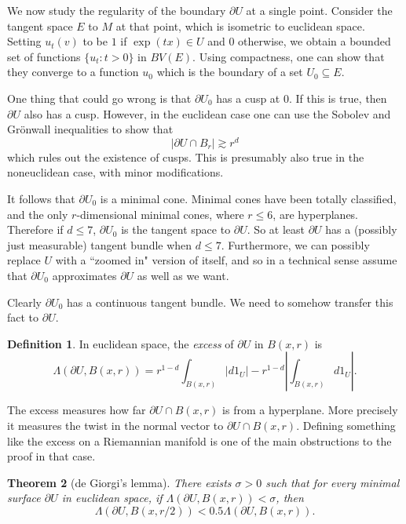 \documentclass[reqno,12pt,letterpaper]{amsart}
\newcommand{\dfn}[1]{\emph{#1}\index{#1}}
\newtheorem{theorem}{Theorem}[section]
\theoremstyle{definition}
\newtheorem{definition}[theorem]{Definition}
\begin{document}
We now study the regularity of the boundary $\partial U$ at a single point.
Consider the tangent space $E$ to $M$ at that point, which is isometric to euclidean space.
Setting $u_t(v)$ to be $1$ if $\exp(tx) \in U$ and $0$ otherwise, we obtain a bounded set of functions $\{u_t: t > 0\}$ in $BV(E)$.
Using compactness, one can show that they converge to a function $u_0$ which is the boundary of a set $U_0 \subseteq E$.

One thing that could go wrong is that $\partial U_0$ has a cusp at $0$.
If this is true, then $\partial U$ also has a cusp. However, in the euclidean case one can use the Sobolev and Gr\"onwall inequalities to show that
$$|\partial U \cap B_r| \gtrsim r^d$$
which rules out the existence of cusps.
This is presumably also true in the noneuclidean case, with minor modifications.

It follows that $\partial U_0$ is a minimal cone.
Minimal cones have been totally classified, and the only $r$-dimensional minimal cones, where $r \leq 6$, are hyperplanes.
Therefore if $d \leq 7$, $\partial U_0$ is the tangent space to $\partial U$.
So at least $\partial U$ has a (possibly just measurable) tangent bundle when $d \leq 7$.
Furthermore, we can possibly replace $U$ with a ``zoomed in" version of itself, and so in a technical sense assume that $\partial U_0$ approximates $\partial U$ as well as we want.

Clearly $\partial U_0$ has a continuous tangent bundle.
We need to somehow transfer this fact to $\partial U$.

\begin{definition}
In euclidean space, the \dfn{excess} of $\partial U$ in $B(x, r)$ is
$$\Lambda(\partial U, B(x, r)) = r^{1 - d}\int_{B(x, r)} |d1_U| - r^{1 - d} \left|\int_{B(x, r)} d1_U\right|.$$
\end{definition}

The excess measures how far $\partial U \cap B(x, r)$ is from a hyperplane.
More precisely it measures the twist in the normal vector to $\partial U \cap B(x, r)$.
Defining something like the excess on a Riemannian manifold is one of the main obstructions to the proof in that case.

\begin{theorem}[de Giorgi's lemma]
There exists $\sigma > 0$ such that for every minimal surface $\partial U$ in euclidean space, if $\Lambda(\partial U, B(x, r)) < \sigma$, then
$$\Lambda(\partial U, B(x, r/2)) < 0.5 \Lambda(\partial U, B(x, r)).$$
\end{theorem}
\end{document}
